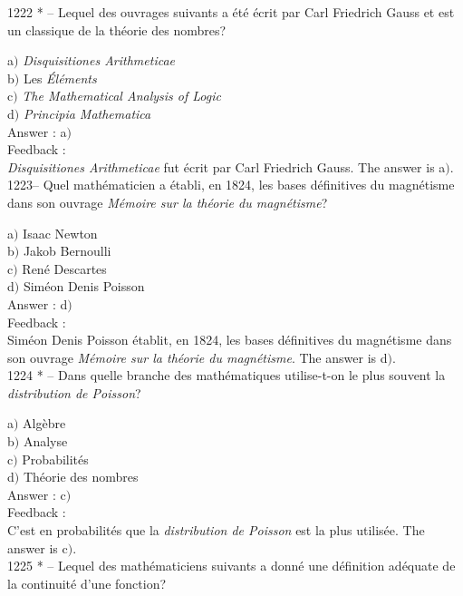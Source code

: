 ﻿\documentclass[letterpaper, 12pt]{article}
\begin{document}
1222 * -- Lequel des ouvrages suivants a \'et\'e \'ecrit par Carl
Friedrich Gauss et est un classique de la th\'eorie des nombres?

a$)$ {\sl Disquisitiones Arithmeticae} \\
b$)$ Les {\sl \'El\'ements} \\
c$)$ {\sl The Mathematical Analysis of Logic} \\
d$)$ {\sl Principia Mathematica}\\

Answer : a$)$\\

Feedback : \\
{\sl Disquisitiones Arithmeticae} fut \'ecrit par Carl Friedrich
Gauss.
The answer is a$)$.\\

1223-- Quel math\'ematicien a \'etabli, en 1824, les bases
d\'efinitives du magn\'etisme dans son ouvrage {\sl M\'emoire sur la
th\'eorie du magn\'etisme}?

a$)$ Isaac Newton \\
b$)$ Jakob Bernoulli \\
c$)$ Ren\'e Descartes \\
d$)$ Sim\'eon Denis Poisson\\

Answer : d$)$\\

Feedback : \\
Sim\'eon Denis Poisson \'etablit, en 1824, les bases d\'efinitives
du magn\'etisme dans son ouvrage {\sl M\'emoire sur la th\'eorie du
magn\'etisme}.
The answer is d$)$.\\

1224 * -- Dans quelle branche des math\'ematiques utilise-t-on le
plus souvent la {\sl distribution de Poisson}?

a$)$ Alg\`ebre \\
b$)$ Analyse \\
c$)$ Probabilit\'es \\
d$)$ Th\'eorie des nombres\\

Answer : c$)$\\

Feedback : \\
C'est en probabilit\'es que la {\sl distribution de Poisson} est la plus
utilis\'ee.
The answer is c$)$.\\

1225 * -- Lequel des math\'ematiciens suivants a donn\'e une
d\'efinition ad\'equate de la continuit\'e d'une fonction?
\end{document}
